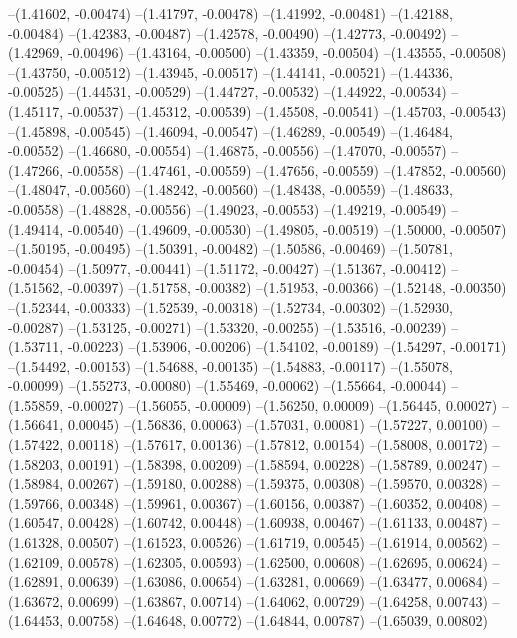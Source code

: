 --(1.41602, -0.00474)
--(1.41797, -0.00478)
--(1.41992, -0.00481)
--(1.42188, -0.00484)
--(1.42383, -0.00487)
--(1.42578, -0.00490)
--(1.42773, -0.00492)
--(1.42969, -0.00496)
--(1.43164, -0.00500)
--(1.43359, -0.00504)
--(1.43555, -0.00508)
--(1.43750, -0.00512)
--(1.43945, -0.00517)
--(1.44141, -0.00521)
--(1.44336, -0.00525)
--(1.44531, -0.00529)
--(1.44727, -0.00532)
--(1.44922, -0.00534)
--(1.45117, -0.00537)
--(1.45312, -0.00539)
--(1.45508, -0.00541)
--(1.45703, -0.00543)
--(1.45898, -0.00545)
--(1.46094, -0.00547)
--(1.46289, -0.00549)
--(1.46484, -0.00552)
--(1.46680, -0.00554)
--(1.46875, -0.00556)
--(1.47070, -0.00557)
--(1.47266, -0.00558)
--(1.47461, -0.00559)
--(1.47656, -0.00559)
--(1.47852, -0.00560)
--(1.48047, -0.00560)
--(1.48242, -0.00560)
--(1.48438, -0.00559)
--(1.48633, -0.00558)
--(1.48828, -0.00556)
--(1.49023, -0.00553)
--(1.49219, -0.00549)
--(1.49414, -0.00540)
--(1.49609, -0.00530)
--(1.49805, -0.00519)
--(1.50000, -0.00507)
--(1.50195, -0.00495)
--(1.50391, -0.00482)
--(1.50586, -0.00469)
--(1.50781, -0.00454)
--(1.50977, -0.00441)
--(1.51172, -0.00427)
--(1.51367, -0.00412)
--(1.51562, -0.00397)
--(1.51758, -0.00382)
--(1.51953, -0.00366)
--(1.52148, -0.00350)
--(1.52344, -0.00333)
--(1.52539, -0.00318)
--(1.52734, -0.00302)
--(1.52930, -0.00287)
--(1.53125, -0.00271)
--(1.53320, -0.00255)
--(1.53516, -0.00239)
--(1.53711, -0.00223)
--(1.53906, -0.00206)
--(1.54102, -0.00189)
--(1.54297, -0.00171)
--(1.54492, -0.00153)
--(1.54688, -0.00135)
--(1.54883, -0.00117)
--(1.55078, -0.00099)
--(1.55273, -0.00080)
--(1.55469, -0.00062)
--(1.55664, -0.00044)
--(1.55859, -0.00027)
--(1.56055, -0.00009)
--(1.56250, 0.00009)
--(1.56445, 0.00027)
--(1.56641, 0.00045)
--(1.56836, 0.00063)
--(1.57031, 0.00081)
--(1.57227, 0.00100)
--(1.57422, 0.00118)
--(1.57617, 0.00136)
--(1.57812, 0.00154)
--(1.58008, 0.00172)
--(1.58203, 0.00191)
--(1.58398, 0.00209)
--(1.58594, 0.00228)
--(1.58789, 0.00247)
--(1.58984, 0.00267)
--(1.59180, 0.00288)
--(1.59375, 0.00308)
--(1.59570, 0.00328)
--(1.59766, 0.00348)
--(1.59961, 0.00367)
--(1.60156, 0.00387)
--(1.60352, 0.00408)
--(1.60547, 0.00428)
--(1.60742, 0.00448)
--(1.60938, 0.00467)
--(1.61133, 0.00487)
--(1.61328, 0.00507)
--(1.61523, 0.00526)
--(1.61719, 0.00545)
--(1.61914, 0.00562)
--(1.62109, 0.00578)
--(1.62305, 0.00593)
--(1.62500, 0.00608)
--(1.62695, 0.00624)
--(1.62891, 0.00639)
--(1.63086, 0.00654)
--(1.63281, 0.00669)
--(1.63477, 0.00684)
--(1.63672, 0.00699)
--(1.63867, 0.00714)
--(1.64062, 0.00729)
--(1.64258, 0.00743)
--(1.64453, 0.00758)
--(1.64648, 0.00772)
--(1.64844, 0.00787)
--(1.65039, 0.00802)
